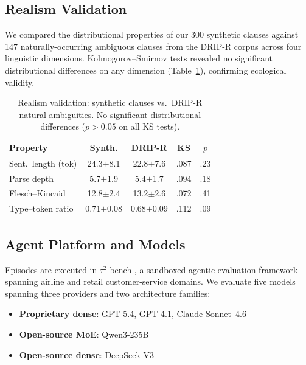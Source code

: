 \documentclass[11pt,a4paper]{article}
\begin{document}
\subsection{Realism Validation}
\label{sec:realism}
We compared the distributional properties of our 300 synthetic clauses against 147 naturally-occurring ambiguous clauses from the DRIP-R corpus \cite{zhoudriprbenchmark} across four linguistic dimensions.
Kolmogorov--Smirnov tests revealed no significant distributional differences on any dimension (Table~\ref{tab:realism}), confirming ecological validity.

\begin{table}[t]
\centering
\small
\begin{tabular}{lcccc}
\toprule
\textbf{Property} & \textbf{Synth.} & \textbf{DRIP-R} & \textbf{KS} & $p$ \\
\midrule
Sent.\ length (tok) & 24.3{\scriptsize$\pm$8.1} & 22.8{\scriptsize$\pm$7.6} & .087 & .23 \\
Parse depth & 5.7{\scriptsize$\pm$1.9} & 5.4{\scriptsize$\pm$1.7} & .094 & .18 \\
Flesch--Kincaid & 12.8{\scriptsize$\pm$2.4} & 13.2{\scriptsize$\pm$2.6} & .072 & .41 \\
Type--token ratio & 0.71{\scriptsize$\pm$0.08} & 0.68{\scriptsize$\pm$0.09} & .112 & .09 \\
\bottomrule
\end{tabular}
\caption{Realism validation: synthetic clauses vs.\ DRIP-R natural ambiguities. No significant distributional differences ($p > 0.05$ on all KS tests).}
\label{tab:realism}
\end{table}

\subsection{Agent Platform and Models}
Episodes are executed in $\tau^2$-bench \cite{zhou2024tau}, a sandboxed agentic evaluation framework spanning airline and retail customer-service domains.
We evaluate five models spanning three providers and two architecture families:

\begin{itemize}
\item \textbf{Proprietary dense}: GPT-5.4, GPT-4.1, Claude Sonnet~4.6
\item \textbf{Open-source MoE}: Qwen3-235B
\item \textbf{Open-source dense}: DeepSeek-V3
\end{itemize}
\end{document}
